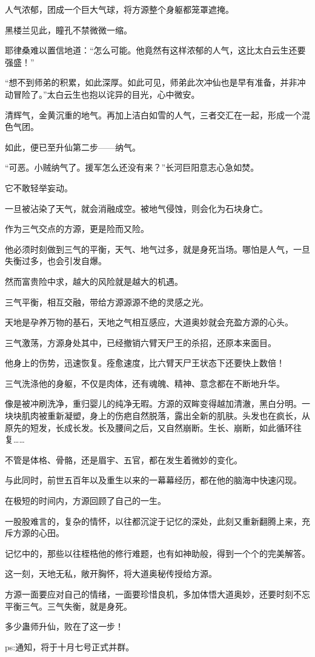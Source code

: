\begin{this_body}
人气浓郁，团成一个巨大气球，将方源整个身躯都笼罩遮掩。

黑楼兰见此，瞳孔不禁微微一缩。

耶律桑难以置信地道：“怎么可能。他竟然有这样浓郁的人气，这比太白云生还要强盛！”

“想不到师弟的积累，如此深厚。如此可见，师弟此次冲仙也是早有准备，并非冲动冒险了。”太白云生也抱以诧异的目光，心中微安。

清辉气，金黄沉重的地气。再加上洁白如雪的人气，三者交汇在一起，形成一个混色气团。

如此，便已至升仙第二步——纳气。

“可恶。小贼纳气了。援军怎么还没有来？”长河巨阳意志心急如焚。

它不敢轻举妄动。

一旦被沾染了天气，就会消融成空。被地气侵蚀，则会化为石块身亡。

作为三气交点的方源，更是险而又险。

他必须时刻做到三气的平衡，天气、地气过多，就是身死当场。哪怕是人气，一旦失衡过多，也会引发自爆。

然而富贵险中求，越大的风险就是越大的机遇。

三气平衡，相互交融，带给方源源源不绝的灵感之光。

天地是孕养万物的基石，天地之气相互感应，大道奥妙就会充盈方源的心头。

三气激荡，方源身处其中，已经撤销六臂天尸王的杀招，还原本来面目。

他身上的伤势，迅速恢复。痊愈速度，比六臂天尸王状态下还要快上数倍！

三气洗涤他的身躯，不仅是肉体，还有魂魄、精神、意念都在不断地升华。

像是被冲刷洗净，重归婴儿的纯净无暇。方源的双眸变得越加清澈，黑白分明。一块块肌肉被重新凝塑，身上的伤疤自然脱落，露出全新的肌肤。头发也在疯长，从原先的短发，长成长发。长及腰间之后，又自然崩断。生长、崩断，如此循环往复……

不管是体格、骨骼，还是眉宇、五官，都在发生着微妙的变化。

与此同时，前世五百年以及重生以来的一幕幕经历，都在他的脑海中快速闪现。

在极短的时间内，方源回顾了自己的一生。

一股股难言的，复杂的情怀，以往都沉淀于记忆的深处，此刻又重新翻腾上来，充斥方源的心田。

记忆中的，那些以往桎梏他的修行难题，也有如神助般，得到一个个的完美解答。

这一刻，天地无私，敞开胸怀，将大道奥秘传授给方源。

方源一面要应对自己的情绪，一面要珍惜良机，多加体悟大道奥妙，还要时刻不忘平衡三气。三气失衡，就是身死。

多少蛊师升仙，败在了这一步！

ps:通知，将于十月七号正式并群。

\end{this_body}

